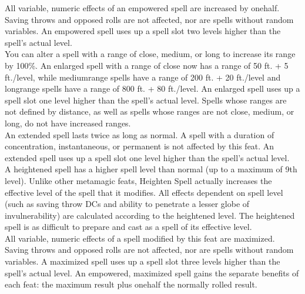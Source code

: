 \begin{multicols}{2}

{All variable, numeric effects of an empowered spell are increased by one\textendash half.
Saving throws and opposed rolls are not affected, nor are spells without random variables. An empowered spell uses up a spell slot two levels higher than the spell's actual level.}\\

{You can alter a spell with a range of close, medium, or long to increase its range by 100\%. An enlarged spell with a range of close now has a range of 50 ft. + 5 ft./level, while medium\textendash range spells have a range of 200 ft. + 20 ft./level and long\textendash range spells have a range of 800 ft. + 80 ft./level. An enlarged spell uses up a spell slot one level higher than the spell's actual level.
Spells whose ranges are not defined by distance, as well as spells whose ranges are not close, medium, or long, do not have increased ranges.}\\

{An extended spell lasts twice as long as normal. A spell with a duration of concentration, instantaneous, or permanent is not affected by this feat. An extended spell uses up a spell slot one level higher than the spell's actual level.}\\

{A heightened spell has a higher spell level than normal (up to a maximum of 9th level). Unlike other metamagic feats, Heighten Spell actually increases the effective level of the spell that it modifies. All effects dependent on spell level (such as saving throw DCs and ability to penetrate a lesser globe of invulnerability) are calculated according to the heightened level. The heightened spell is as difficult to prepare and cast as a spell of its effective level.}\\

{All variable, numeric effects of a spell modified by this feat are maximized. Saving throws and opposed rolls are not affected, nor are spells without random variables. A maximized spell uses up a spell slot three levels higher than the spell's actual level.
An empowered, maximized spell gains the separate benefits of each feat: the maximum result plus one\textendash half the normally rolled result.}\\


\end{multicols}
